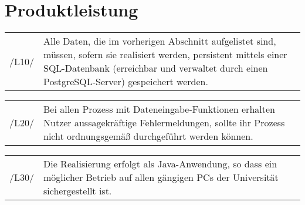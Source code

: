 \section{Produktleistung}
\label{sec:Produktleistung}


\begin{tabular}{p{1.5cm}p{14.5cm}}


	 /L10/	& Alle Daten, die im vorherigen Abschnitt aufgelistet sind, müssen, sofern sie realisiert werden, persistent mittels einer SQL-Datenbank (erreichbar und verwaltet durch einen PostgreSQL-Server) gespeichert werden. \\[0.25cm]
	 
\end{tabular}


\begin{tabular}{p{1.5cm}p{14.5cm}}
						
	 /L20/	& Bei allen Prozess mit Dateneingabe-Funktionen erhalten Nutzer aussagekräftige Fehlermeldungen, sollte ihr Prozess nicht ordnungsgemäß durchgeführt werden können. \\[0.25cm]
	 
\end{tabular}


\begin{tabular}{p{1.5cm}p{14.5cm}}
						
	 /L30/	& Die Realisierung erfolgt als Java-Anwendung, so dass ein möglicher Betrieb auf allen gängigen PCs der Universität sichergestellt ist. \\[0.25cm]

\end{tabular}


